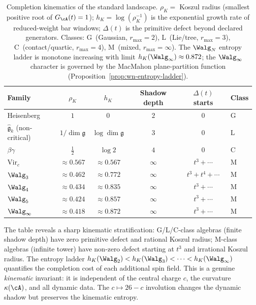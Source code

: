 \begin{table}[ht]
\centering
\begin{tabular}{lccccl}
\toprule
\textbf{Family} & $\rho_K$ & $h_K$ & \textbf{Shadow depth}
 & $\Delta(t)$ starts & \textbf{Class} \\
\midrule
Heisenberg & $1$ & $0$ & $2$ & $0$ & G \\
$\hat{\mathfrak{g}}_k$ \textup{(}non-critical\textup{)} & $1/\dim\mathfrak{g}$ & $\log\dim\mathfrak{g}$ & $3$ & $0$ & L \\
$\beta\gamma$ & $\tfrac{1}{2}$ & $\log 2$ & $4$ & $0$ & C \\
$\mathrm{Vir}_c$ & $\approx 0.567$ & $\approx 0.567$ & $\infty$ & $t^3 + \cdots$ & M \\
$\Walg_3$ & $\approx 0.462$ & $\approx 0.772$ & $\infty$ & $t^3 + t^4 + \cdots$ & M \\
$\Walg_4$ & $\approx 0.434$ & $\approx 0.835$ & $\infty$ & $t^3 + \cdots$ & M \\
$\Walg_5$ & $\approx 0.424$ & $\approx 0.857$ & $\infty$ & $t^3 + \cdots$ & M \\
$\Walg_\infty$ & $\approx 0.418$ & $\approx 0.872$ & $\infty$ & $t^3 + \cdots$ & M \\
\bottomrule
\end{tabular}
\caption{Completion kinematics of the standard landscape.
 $\rho_K = $ Koszul radius (smallest positive root of $G_\cA(t)=1$);
 $h_K = \log(\rho_K^{-1})$ is the exponential growth rate of
 reduced-weight bar windows; $\Delta(t)$ is the primitive defect
 beyond declared generators.
 Classes: G~(Gaussian, $r_{\max}=2$),
 L~(Lie/tree, $r_{\max}=3$),
 C~(contact/quartic, $r_{\max}=4$),
 M~(mixed, $r_{\max}=\infty$).
 The $\Walg_N$ entropy ladder is monotone increasing with limit
 $h_K(\Walg_\infty) \approx 0.872$; the $\Walg_\infty$ character
 is governed by the MacMahon plane-partition function
 (Proposition~\ref{prop:wn-entropy-ladder}).}
\label{tab:completion-kinematics}
\end{table}

\begin{remark}[Interpretation]
\label{rem:completion-kinematics-interpretation}
The table reveals a sharp kinematic stratification: G/L/C-class
algebras (finite shadow depth) have zero primitive defect and rational
Koszul radius; M-class algebras (infinite tower) have non-zero defect
starting at $t^3$ and irrational Koszul radius. The entropy ladder
$h_K(\Walg_2) < h_K(\Walg_3) < \cdots < h_K(\Walg_\infty)$ quantifies
the completion cost of each additional spin field. This is a genuine
\emph{kinematic} invariant: it is independent of the central charge
$c$, the curvature $\kappa(\cA)$, and all dynamic data. The
$c \mapsto 26-c$ involution changes the dynamic shadow but preserves
the kinematic entropy.
\end{remark}

